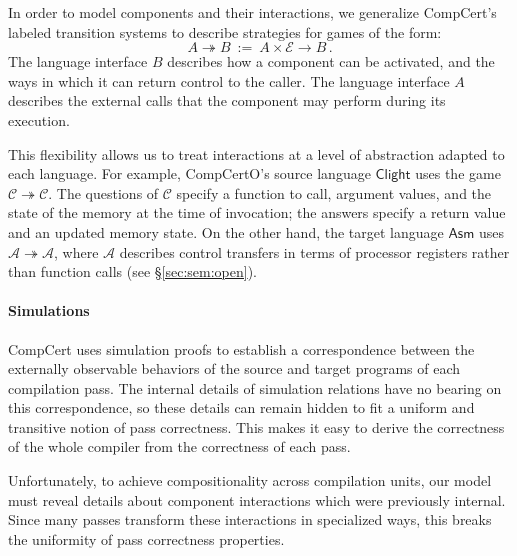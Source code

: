 \documentclass[sigplan,screen,review]{acmart}
\newcommand{\kw}[1]{\ensuremath{ \mathsf{#1} }}
\begin{document}
In order to model components and their interactions,
we generalize CompCert's labeled transition systems
to describe strategies for games of the form:
\[ A \twoheadrightarrow B \: := \:
   A \times \mathcal{E} \rightarrow B \,. \]
The language interface $B$ describes how a component can be activated,
and the ways in which it can return control to the caller.
The language interface $A$ describes the external calls that the component
may perform during its execution.

This flexibility allows us to treat interactions
at a level of abstraction adapted to each language.
For example, CompCertO's source language \kw{Clight} uses the game
\mbox{$\mathcal{C} \twoheadrightarrow \mathcal{C}$}.
The questions of $\mathcal{C}$ specify a function to call,
argument values,
and the state of the memory at the time of invocation;
the answers specify a return value and an updated memory state.
On the other hand, the target language \kw{Asm} uses
$\mathcal{A} \twoheadrightarrow \mathcal{A}$,
where $\mathcal{A}$ describes control transfers
in terms of processor registers
rather than function calls (see \S\ref{sec:sem:open}).



\paragraph{Simulations} %

CompCert uses simulation proofs
to establish a correspondence between
the externally observable behaviors of
the source and target programs of each compilation pass.
The internal details of simulation relations
have no bearing on this correspondence,
so these details can remain hidden
to fit a uniform and transitive notion of pass correctness.
This makes it easy to derive the correctness
of the whole compiler
from the correctness of each pass.

Unfortunately,
to achieve compositionality across compilation units,
our model must reveal details
about component interactions
which were previously internal.
Since many passes transform
these interactions in
specialized ways,
this breaks the uniformity
of pass correctness properties.
\end{document}
